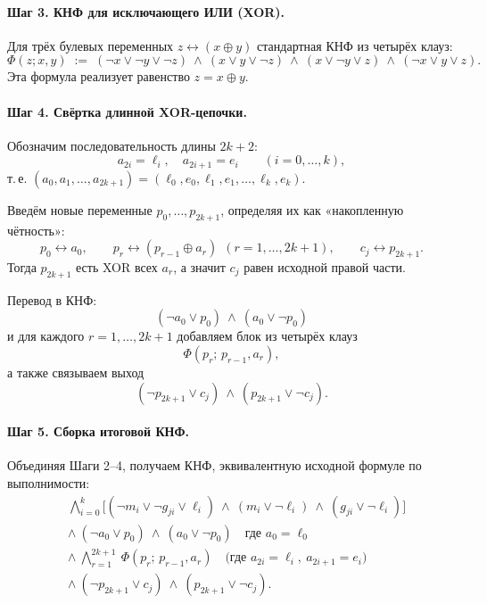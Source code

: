 \paragraph{Шаг 3. КНФ для исключающего ИЛИ (XOR).}
Для трёх булевых переменных $z \leftrightarrow (x \oplus y)$ стандартная КНФ из четырёх клауз:
\[
\Phi(z;x,y) \;:=\;
(\neg x \lor \neg y \lor \neg z)\ \land\
(x \lor y \lor \neg z)\ \land\
(x \lor \neg y \lor z)\ \land\
(\neg x \lor y \lor z).
\]
Эта формула реализует равенство $z = x \oplus y$.

\paragraph{Шаг 4. Свёртка длинной XOR-цепочки.}
Обозначим последовательность длины $2k{+}2$:
\[
a_{2i}=\ell_i,\quad a_{2i+1}=e_i \qquad (i=0,\ldots,k),
\]
т.\,е. $(a_0,a_1,\ldots,a_{2k+1})=(\ell_0,e_0,\ell_1,e_1,\ldots,\ell_k,e_k)$.

Введём новые переменные $p_0,\ldots,p_{2k+1}$, определяя их как «накопленную чётность»:
\[
p_0 \leftrightarrow a_0, \qquad
p_r \leftrightarrow (p_{r-1} \oplus a_r)\ \ (r=1,\ldots,2k{+}1),
\qquad
c_j \leftrightarrow p_{2k+1}.
\]
Тогда $p_{2k+1}$ есть XOR всех $a_r$, а значит $c_j$ равен исходной правой части.

Перевод в КНФ:
\[
(\neg a_0 \lor p_0)\ \land\ (a_0 \lor \neg p_0)
\]
и для каждого $r=1,\ldots,2k{+}1$ добавляем блок из четырёх клауз
\[
\Phi(p_r;\,p_{r-1},a_r),
\]
а также связываем выход
\[
(\neg p_{2k+1} \lor c_j)\ \land\ (p_{2k+1} \lor \neg c_j).
\]

\paragraph{Шаг 5. Сборка итоговой КНФ.}
Объединяя Шаги 2–4, получаем КНФ, эквивалентную исходной формуле по выполнимости:
\[
\begin{aligned}
&\bigwedge_{i=0}^{k}
\Big[(\neg m_i \lor \neg g_{ji} \lor \ell_i)\ \land\ (m_i \lor \neg \ell_i)\ \land\ (g_{ji} \lor \neg \ell_i)\Big] \\[1mm]
&\land\ (\neg a_0 \lor p_0)\ \land\ (a_0 \lor \neg p_0) \quad\text{где } a_0=\ell_0 \\[1mm]
&\land\ \bigwedge_{r=1}^{2k+1}\ \Phi(p_r;\,p_{r-1},a_r)
\quad\text{(где } a_{2i}=\ell_i,\ a_{2i+1}=e_i\text{)}\\[1mm]
&\land\ (\neg p_{2k+1} \lor c_j)\ \land\ (p_{2k+1} \lor \neg c_j).
\end{aligned}
\]


